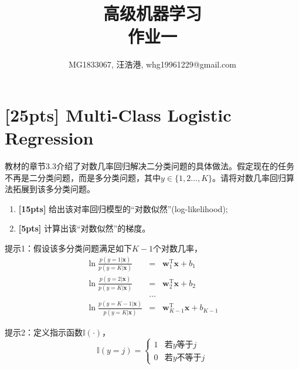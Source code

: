 \documentclass[a4paper,UTF8]{article}
\numberwithin{equation}{section}
\begin{document}
	\title{高级机器学习\\
		作业一}
	\author{MG1833067, 汪浩港, whg19961229@gmail.com}
	\maketitle
	
	\section{[25pts] Multi-Class Logistic Regression}
	教材的章节3.3介绍了对数几率回归解决二分类问题的具体做法。假定现在的任务不再是二分类问题，而是多分类问题，其中$y\in\{1,2\dots,K\}$。请将对数几率回归算法拓展到该多分类问题。
	
	\begin{enumerate}[(1)]
		\item \textbf{[15pts]} 给出该对率回归模型的“对数似然”(log-likelihood);
		\item \textbf{[5pts]} 计算出该“对数似然”的梯度。
	\end{enumerate}
	
	提示1：假设该多分类问题满足如下$K-1$个对数几率，
	\begin{eqnarray*}
		\ln\frac{p(y=1|\mathbf{x})}{p(y=K|\mathbf{x})}&=&\mathbf{w}_1^\mathrm{T}\mathbf{x}+b_1\\
		\ln\frac{p(y=2|\mathbf{x})}{p(y=K|\mathbf{x})}&=&\mathbf{w}_2^\mathrm{T}\mathbf{x}+b_2\\
		&\dots&\\
		\ln\frac{p(y={K-1}|\mathbf{x})}{p(y=K|\mathbf{x})}&=&\mathbf{w}_{K-1}^\mathrm{T}\mathbf{x}+b_{K-1}
	\end{eqnarray*}
	
	提示2：定义指示函数$\mathbb{I}(\cdot)$，
	$$\mathbb{I}(y=j)=
	\begin{cases}
	1& \text{若$y$等于$j$}\\
	0& \text{若$y$不等于$j$}
	\end{cases}$$
	
\end{document}
